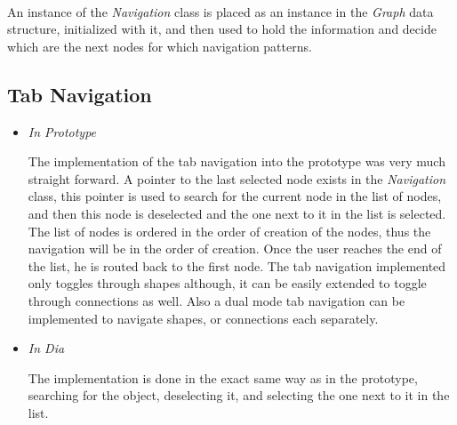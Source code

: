 \paragraph{}
An instance of the {\it Navigation} class is placed as an instance in the {\it Graph} data structure, initialized with it, and then used to hold the information and decide which are the next nodes for which navigation patterns.


\subsection{Tab Navigation}
\begin{itemize}
\item {\it In Prototype}
\par \noindent
The implementation of the tab navigation into the prototype was very much straight forward. A pointer to the last selected node exists in the {\it Navigation} class, this pointer is used to search for the current node in the list of nodes, and then this node is deselected and the one next to it in the list is selected. The list of nodes is ordered in the order of creation of the nodes, thus the navigation will be in the order of creation. Once the user reaches the end of the list, he is routed back to the first node. The tab navigation implemented only toggles through shapes although, it can be easily extended to toggle through connections as well. Also a dual mode tab navigation can be implemented to navigate shapes, or connections each separately.

\item {\it In Dia}
\par \noindent
The implementation is done in the exact same way as in the prototype, searching for the object, deselecting it, and selecting the one next to it in the list.
\end{itemize}


